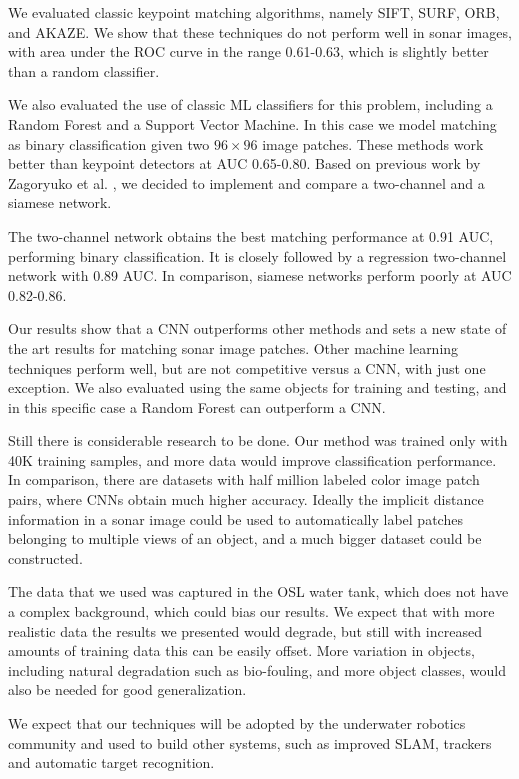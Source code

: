 We evaluated classic keypoint matching algorithms, namely SIFT, SURF, ORB, and AKAZE. We show that these techniques do not perform well in sonar images, with area under the ROC curve in the range 0.61-0.63, which is slightly better than a random classifier.

We also evaluated the use of classic ML classifiers for this problem, including a Random Forest and a Support Vector Machine. In this case we model matching as binary classification given two $96 \times 96$ image patches. These methods work better than keypoint detectors at AUC 0.65-0.80. Based on previous work by Zagoryuko et al. \cite{zagoruyko2015learning}, we decided to implement and compare a two-channel and a siamese network.

The two-channel network obtains the best matching performance at 0.91 AUC, performing binary classification. It is closely followed by a regression two-channel network with 0.89 AUC. In comparison, siamese networks perform poorly at AUC 0.82-0.86.

Our results show that a CNN outperforms other methods and sets a new state of the art results for matching sonar image patches. Other machine learning techniques perform well, but are not competitive versus a CNN, with just one exception. We also evaluated using the same objects for training and testing, and in this specific case a Random Forest can outperform a CNN.

Still there is considerable research to be done. Our method was trained only with 40K training samples, and more data would improve classification performance. In comparison, there are datasets with half million labeled color image patch pairs, where CNNs obtain much higher accuracy. Ideally the implicit distance information in a sonar image could be used to automatically label patches belonging to multiple views of an object, and a much bigger dataset could be constructed.

The data that we used was captured in the OSL water tank, which does not have a complex background, which could bias our results. We expect that with more realistic data the results we presented would degrade, but still with increased amounts of training data this can be easily offset. More variation in objects, including natural degradation such as bio-fouling, and more object classes, would also be needed for good generalization.

We expect that our techniques will be adopted by the underwater robotics community and used to build other systems, such as improved SLAM, trackers and automatic target recognition.